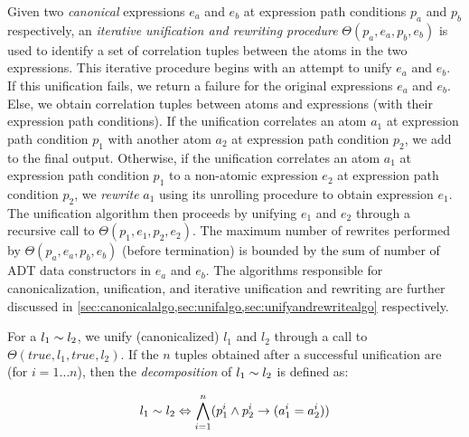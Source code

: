 Given two {\em canonical} expressions $e_a$ and $e_b$ at expression path conditions $p_a$ and $p_b$
respectively, an {\em iterative unification and rewriting procedure}
$\Theta(p_a,e_a,p_b,e_b)$ is used to identify a set of correlation tuples
between the atoms in the two expressions.
This iterative procedure begins with an attempt to unify $e_a$ and $e_b$.
If this unification fails, we return a failure for the original expressions $e_a$ and $e_b$.
Else, we obtain correlation tuples between atoms and expressions
(with their expression path conditions).
If the unification correlates an atom $a_1$ at expression path condition $p_1$
with another atom $a_2$ at expression path condition $p_2$, we add  to the final output.
Otherwise, if the unification correlates an atom $a_1$ at expression path condition $p_1$
to a non-atomic expression $e_2$ at expression path condition $p_2$,
we {\em rewrite} $a_1$ using its unrolling procedure to obtain expression $e_1$.
The unification algorithm then proceeds by unifying $e_1$ and $e_2$ through
a recursive call to $\Theta(p_1,e_1,p_2,e_2)$.
The maximum number of rewrites performed by $\Theta(p_a,e_a,p_b,e_b)$ (before termination)
is bounded by the sum of number of ADT data constructors in $e_a$ and $e_b$.
The algorithms responsible for canonicalization, unification, and iterative unification and rewriting
are further discussed in \cref{sec:canonicalalgo,sec:unifalgo,sec:unifyandrewritealgo} respectively.

For a \recursiveRelation{} $l_1 \sim{} l_2$, we unify (canonicalized) $l_1$ and $l_2$ through a
call to $\Theta(true,l_1,true,l_2)$.
If the $n$ tuples obtained after a successful unification are 
(for $i=1\ldots n$), then the {\em decomposition} of $l_1 \sim{} l_2$ is defined as:

\begin{equation}
\label{eqn:decompose}
l_1 \sim{} l_2 \Leftrightarrow \bigwedge \limits_{i=1}^n (p_1^i \land p_2^i \rightarrow (a_1^i = a_2^i))
\end{equation}

